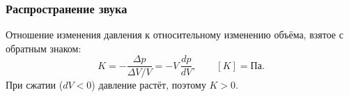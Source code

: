 \documentclass[12pt]{article}
\begin{document}


	\subsubsection{Распространение звука}

	\begin{definition}
		Отношение изменения давления к относительному изменению объёма, взятое с обратным знаком:
		\[
			K = -\dfrac{\varDelta p}{\varDelta V / V} = -V\,\dfrac{dp}{dV}, \qquad [K] = \text{Па}.
		\]
		При сжатии ($dV < 0$) давление растёт, поэтому $K > 0$.
	\end{definition}
\end{document}
